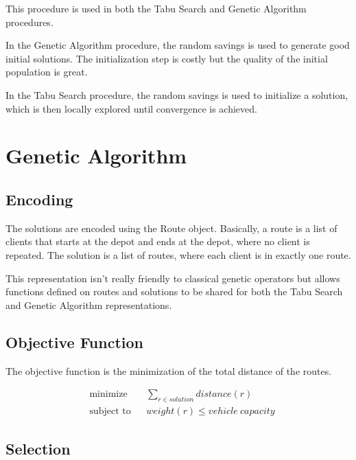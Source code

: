 \documentclass{article} %
\begin{document}
This procedure is used in both the Tabu Search and Genetic Algorithm procedures.\newline

In the Genetic Algorithm procedure, the random savings is used to generate good initial solutions. The initialization step is costly but the quality of the initial population is great.\newline

In the Tabu Search procedure, the random savings is used to initialize a solution, which is then locally explored until convergence is achieved.


\newpage
\section{Genetic Algorithm}
\label{genetic_algorithm}

\subsection{Encoding}

The solutions are encoded using the Route object. Basically, a route is a list of clients that starts at the depot and ends at the depot, where no client is repeated. The solution is a list of routes, where each client is in exactly one route.\newline

This representation isn't really friendly to classical genetic operators but allows functions defined on routes and solutions to be shared for both the Tabu Search and Genetic Algorithm representations.

\subsection{Objective Function}

The objective function is the minimization of the total distance of the routes.

\begin{equation*}
\begin{aligned}
& \text{minimize}
& & \sum\limits_{r \in solution} distance(r) \\
& \text{subject to}
& & weight(r) \leq vehicle\ capacity
\end{aligned}
\end{equation*}

\subsection{Selection}
\end{document}
